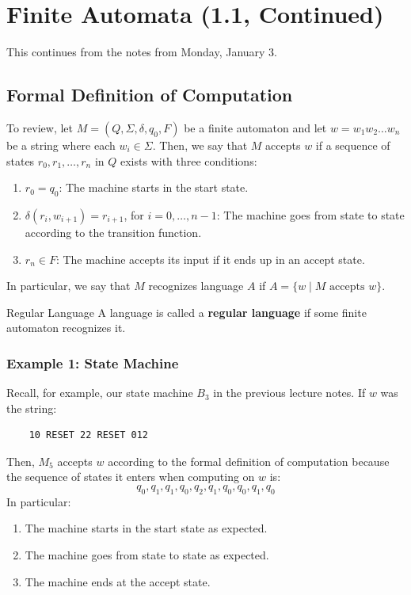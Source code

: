 \documentclass[letterpaper]{article}
\begin{document}
\section{Finite Automata (1.1, Continued)}
This continues from the notes from Monday, January 3.

\subsection{Formal Definition of Computation}
To review, let $M = (Q, \Sigma, \delta, q_0, F)$ be a finite automaton and let $w = w_1 w_2 \dots w_n$ be a string where each $w_i \in \Sigma$. Then, we say that $M$ accepts $w$ if a sequence of states $r_0, r_1, \dots, r_n$ in $Q$ exists with three conditions: 
\begin{enumerate}
    \item $r_0 = q_0$: The machine starts in the start state. 
    \item $\delta(r_i, w_{i + 1}) = r_{i + 1}$, for $i = 0, \dots, n - 1$: The machine goes from state to state according to the transition function. 
    \item $r_n \in F$: The machine accepts its input if it ends up in an accept state. 
\end{enumerate}
In particular, we say that $M$ recognizes language $A$ if $A = \{w \mid M \text{ accepts } w\}$.
\begin{definition}{Regular Language}{}
    A language is called a \textbf{regular language} if some finite automaton recognizes it.
\end{definition}

\subsubsection{Example 1: State Machine}
Recall, for example, our state machine $B_3$ in the previous lecture notes. If $w$ was the string:
\begin{verbatim}
    10 RESET 22 RESET 012
\end{verbatim}
Then, $M_5$ accepts $w$ according to the formal definition of computation because the sequence of states it enters when computing on $w$ is: 
\[q_0, q_1, q_1, q_0, q_2, q_1, q_0, q_0, q_1, q_0\]
In particular:
\begin{enumerate}
    \item The machine starts in the start state as expected. 
    \item The machine goes from state to state as expected. 
    \item The machine ends at the accept state. 
\end{enumerate}
\end{document}

